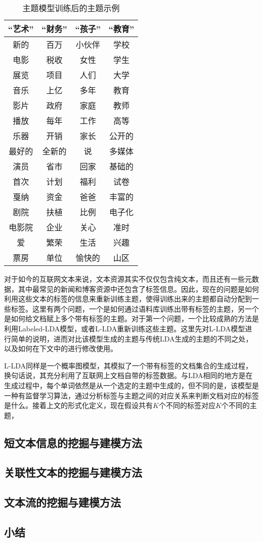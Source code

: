 \begin{table}
\caption{主题模型训练后的主题示例}
\centering
\begin{tabular}{cccc} 
\hline
“艺术” & “财务” & “孩子” & “教育” \\
\hline
新的 & 百万 & 小伙伴 & 学校\\
电影 & 税收 & 女性 & 学生\\
展览 & 项目 & 人们 & 大学\\
音乐 & 上亿 & 多年 & 教育\\
影片 & 政府 & 家庭 & 教师\\
播放 & 每年 & 工作 & 高等\\
乐器 & 开销 & 家长 & 公开的\\
最好的 & 全新的 & 说 & 多媒体\\
演员 & 省市 & 回家 & 基础的\\
首次 & 计划 & 福利 & 试卷\\
戛纳 & 资金 & 爸爸 & 丰富的\\
剧院 & 扶植 & 比例 & 电子化\\
电影院 & 企业 & 关心 & 准时\\
爱 & 繁荣 & 生活 & 兴趣\\
票房 & 单位 & 愉快的 & 山区\\
\hline
\end{tabular}
\label{tbl:topics}
\end{table}

对于如今的互联网文本来说，文本资源其实不仅仅包含纯文本，而且还有一些元数据，其中最常见的新闻和博客资源中还包含了标签信息。因此，现在的问题是如何利用这些文本的标签的信息来重新训练主题，使得训练出来的主题都自动分配到一些标签。这里有两个问题，一个是如何通过语料库训练出带有标签的主题，另一个是如何给文档赋上多个带有标签的主题。对于第一个问题，一个比较成熟的方法是利用Labeled-LDA模型，或者L-LDA\cite{ramage2009labeled}重新训练这些主题。这里先对L-LDA模型进行简单的说明，进而对比该模型生成的主题与传统LDA生成的主题的不同之处，以及如何在下文中的进行修改使用。

L-LDA同样是一个概率图模型，其模拟了一个带有标签的文档集合的生成过程，换句话说，其充分利用了互联网上文档自带的标签数据。与LDA相同的地方是在生成过程中，每个单词依然是从一个选定的主题中生成的，但不同的是，该模型是一种有监督学习算法，通过分析标签与主题之间的对应关系来判断文档对应的标签是什么。接着上文的形式化定义，现在假设共有$K$个不同的标签对应$K$个不同的主题，


\subsection{短文本信息的挖掘与建模方法}

\subsection{关联性文本的挖掘与建模方法}

\subsection{文本流的挖掘与建模方法}

\subsection{小结}
